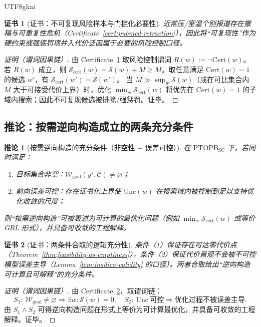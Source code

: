 \documentclass[12pt]{article}
\newtheorem{corollary}{推论}[section]
\newtheorem{certificate}{证书}[section]
\newcommand{\PTOPB}{\ensuremath{\mathrm{PTOPB}}}
\begin{document}
\begin{CJK*}{UTF8}{gkai}
\begin{certificate}[证书：不可复现风险样本与门槛化必要性]
\label{cert:reproducibility-risk}
近常压/室温个别报道存在撤稿与可重复性危机（Certificate~\ref{cert:pubmed-retraction}），因此将“可复现性”作为硬约束或强惩罚项并入代价泛函属于必要的风险控制口径。
\end{certificate}

\begin{proof}[证明（谓词因果链）]
由 Certificate~\ref{cert:reproducibility-risk} 取风险控制谓词 $R(w):=\neg \mathrm{Cert}(w)$。
若 $R(w)$ 成立，则 $\mathcal{S}_{\mathrm{cert}}(w)=\mathcal{S}(w)+M\ge M$。取任意满足 $\mathrm{Cert}(w)=1$ 的候选 $w'$，有 $\mathcal{S}
  _{\mathrm{cert}}(w')=\mathcal{S}(w')$。
当 $M\gg \sup_w \mathcal{S}(w)$（或在可比集合内 $M$ 大于可接受代价上界）时，优化 $\min_w \mathcal{S}_{\mathrm{cert}}(w)$ 将优先在 $\mathrm{Cert}(w)
  =1$ 的子域内搜索；因此不可复现候选被排除/强惩罚。证毕。
\end{proof}

\subsection{推论：按需逆向构造成立的两条充分条件}

\begin{corollary}[按需逆向构造的充分条件（非空性 + 误差可控）]
\label{cor:inverse-design-conditions}
在 \PTOPB$_{\mathrm{SC}}$ 下，若同时满足：
\begin{enumerate}
  \item 目标集合非空：$\mathcal{W}_{\mathrm{goal}}(y^\star,\mathcal{C})\neq\varnothing$；
  \item 前向误差可控：存在证书化上界使 $\mathrm{Unc}(w)$ 在搜索域内被控制到足以支持优化收敛的尺度；
\end{enumerate}
则“按需逆向构造”可被表述为可计算的最优化问题（例如 $\min_w \mathcal{S}_{\mathrm{cert}}(w)$ 或等价 GRL 形式），并具备可收敛的工程解释。
\end{corollary}

\begin{certificate}[证书：两条件合取的逻辑充分性]
\label{cert:inverse-design-sufficient}
条件（1）保证存在可达零代价点（Theorem~\ref{thm:feasibility-as-emptiness}），条件（2）保证代价景观不会被不可控模型误差主导（Lemma~\ref{lem:insilico-validity}
  的口径）。两者合取给出“逆向构造可计算且可解释”的充分条件。
\end{certificate}

\begin{proof}[证明（谓词因果链）]
由 Certificate~\ref{cert:inverse-design-sufficient}，取谓词链：
\[
S_1:\ \mathcal{W}_{\mathrm{goal}}\neq\varnothing \Rightarrow \exists w:\mathcal{S}(w)=0,\quad
S_2:\ \mathrm{Unc}\ \text{可控}\Rightarrow \text{优化过程不被误差主导}.
\]
由 $S_1\wedge S_2$ 可得逆向构造问题在形式上等价为可计算最优化，并具备可收敛的工程解释。证毕。
\end{proof}


\end{CJK*}
\end{document}
